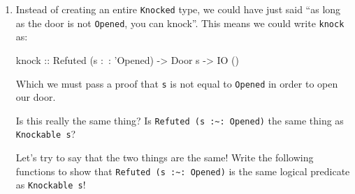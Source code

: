\documentclass[]{article}
\newenvironment{Shaded}{}{}
\newcommand{\DataTypeTok}[1]{\textcolor[rgb]{0.56,0.13,0.00}{#1}}
\newcommand{\FunctionTok}[1]{\textcolor[rgb]{0.02,0.16,0.49}{#1}}
\newcommand{\NormalTok}[1]{#1}
\newcommand{\OtherTok}[1]{\textcolor[rgb]{0.00,0.44,0.13}{#1}}
\renewcommand{\href}[2]{#2\footnote{\url{#1}}}
\begin{document}
\begin{enumerate}
\begin{enumerate}
\begin{Shaded}
\begin{Highlighting}[]
\NormalTok{decideOr}
\OtherTok{    ::}\NormalTok{ (forall x}\FunctionTok{.} \DataTypeTok{Sing}\NormalTok{ x }\OtherTok{->} \DataTypeTok{Decision}\NormalTok{ (p x))}
    \OtherTok{->}\NormalTok{ (forall x}\FunctionTok{.} \DataTypeTok{Sing}\NormalTok{ x }\OtherTok{->} \DataTypeTok{Decision}\NormalTok{ (q x))}
    \OtherTok{->} \DataTypeTok{Sing}\NormalTok{ a}
    \OtherTok{->} \DataTypeTok{Decision}\NormalTok{ (}\DataTypeTok{Or}\NormalTok{ p q a)}
\end{Highlighting}
\end{Shaded}

    These functions actually demonstrate, I feel, why \texttt{Decision} having
    both a \texttt{Proved\ a} and \texttt{Disproved\ (Refuted\ a)} branch is
    very useful. This is because, if you wrote the \emph{structure} of
    \texttt{And} and \texttt{Or} correctly, it's \emph{impossible} to
    incorrectly define \texttt{decideAnd} and \texttt{decideOr}. You can't
    accidentally say false when it's true, or true when it's false --- your
    implementation is guarunteed correct.
  \end{enumerate}

  Solutions available
  \href{https://github.com/mstksg/inCode/tree/master/code-samples/singletons/Door3.hs\#L119-L148}{here}!
\item
  Instead of creating an entire \texttt{Knocked} type, we could have just said
  ``as long as the door is not \texttt{\textquotesingle{}Opened}, you can
  knock''. This means we could write \texttt{knock} as:

\begin{Shaded}
\begin{Highlighting}[]
\OtherTok{knock ::} \DataTypeTok{Refuted}\NormalTok{ (s }\FunctionTok{:~:}\NormalTok{ '}\DataTypeTok{Opened}\NormalTok{) }\OtherTok{->} \DataTypeTok{Door}\NormalTok{ s }\OtherTok{->} \DataTypeTok{IO}\NormalTok{ ()}
\end{Highlighting}
\end{Shaded}

  Which we must pass a proof that \texttt{s} is not equal to
  \texttt{\textquotesingle{}Opened} in order to open our door.

  Is this really the same thing? Is
  \texttt{Refuted\ (s\ :\textasciitilde{}:\ \textquotesingle{}Opened)} the same
  thing as \texttt{Knockable\ s}?

  Let's try to say that the two things are the same! Write the following
  functions to show that
  \texttt{Refuted\ (s\ :\textasciitilde{}:\ \textquotesingle{}Opened)} is the
  same logical predicate as \texttt{Knockable\ s}!


\end{enumerate}
\end{document}

